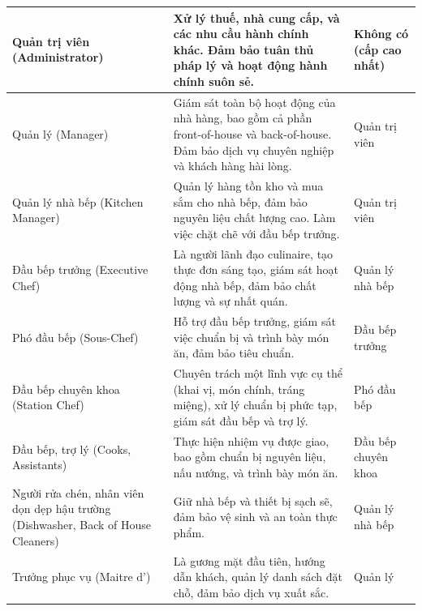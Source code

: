 \begin{longtable}{| p{4cm} | p{8cm} | p{3cm} |}
	Quản trị viên (Administrator)                                                     & Xử lý thuế, nhà cung cấp, và các nhu cầu hành chính khác. Đảm bảo tuân thủ pháp lý và hoạt động hành chính suôn sẻ.                             & Không có (cấp cao nhất) \\
	\hline
	Quản lý (Manager)                                                                 & Giám sát toàn bộ hoạt động của nhà hàng, bao gồm cả phần front-of-house và back-of-house. Đảm bảo dịch vụ chuyên nghiệp và khách hàng hài lòng. & Quản trị viên           \\
	\hline
	Quản lý nhà bếp (Kitchen Manager)                                                 & Quản lý hàng tồn kho và mua sắm cho nhà bếp, đảm bảo nguyên liệu chất lượng cao. Làm việc chặt chẽ với đầu bếp trưởng.                          & Quản trị viên           \\
	\hline
	Đầu bếp trưởng (Executive Chef)                                                   & Là người lãnh đạo culinaire, tạo thực đơn sáng tạo, giám sát hoạt động nhà bếp, đảm bảo chất lượng và sự nhất quán.                             & Quản lý nhà bếp         \\
	\hline
	Phó đầu bếp (Sous-Chef)                                                           & Hỗ trợ đầu bếp trưởng, giám sát việc chuẩn bị và trình bày món ăn, đảm bảo tiêu chuẩn.                                                          & Đầu bếp trưởng          \\
	\hline
	Đầu bếp chuyên khoa (Station Chef)                                                & Chuyên trách một lĩnh vực cụ thể (khai vị, món chính, tráng miệng), xử lý chuẩn bị phức tạp, giám sát đầu bếp và trợ lý.                        & Phó đầu bếp             \\
	\hline
	Đầu bếp, trợ lý (Cooks, Assistants)                                               & Thực hiện nhiệm vụ được giao, bao gồm chuẩn bị nguyên liệu, nấu nướng, và trình bày món ăn.                                                     & Đầu bếp chuyên khoa     \\
	\hline
	Người rửa chén, nhân viên dọn dẹp hậu trường (Dishwasher, Back of House Cleaners) & Giữ nhà bếp và thiết bị sạch sẽ, đảm bảo vệ sinh và an toàn thực phẩm.                                                                          & Quản lý nhà bếp         \\
	\hline
	Trưởng phục vụ (Maitre d')                                                        & Là gương mặt đầu tiên, hướng dẫn khách, quản lý danh sách đặt chỗ, đảm bảo dịch vụ xuất sắc.                                                    & Quản lý                 \\

\end{longtable}
